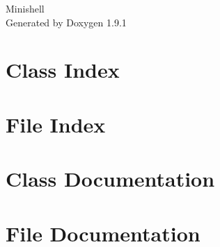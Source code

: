 \let\mypdfximage\pdfximage\def\pdfximage{\immediate\mypdfximage}\documentclass[twoside]{book}
\newcommand{\+}{\discretionary{\mbox{\scriptsize$\hookleftarrow$}}{}{}}
\newcommand{\clearemptydoublepage}{%
  \newpage{\pagestyle{empty}\cleardoublepage}%
}
\begin{document}
\raggedbottom

\hypersetup{pageanchor=false,
             bookmarksnumbered=true,
             pdfencoding=unicode
            }
\begin{titlepage}
\vspace*{7cm}
\begin{center}%
{\Large Minishell }\\
\vspace*{1cm}
{\large Generated by Doxygen 1.9.1}\\
\end{center}
\end{titlepage}
\clearemptydoublepage
{}
\tableofcontents
\clearemptydoublepage
{}
\hypersetup{pageanchor=true}

\chapter{Class Index}

\chapter{File Index}

\chapter{Class Documentation}






\chapter{File Documentation}




















































\backmatter
\newpage
{}
\clearemptydoublepage
{}
\printindex
\end{document}
